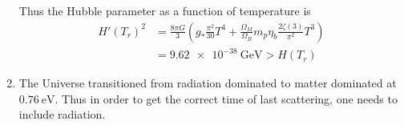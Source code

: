 \begin{enumerate}[label=\alph*)]
      Thus the Hubble parameter as a function of temperature is
      \begin{align}
         H'(T_r)^2 &=  \frac{8 \pi G}{3} \left( g_* \frac{\pi^2}{30} T^4 + \frac{\Omega_M}{\Omega_B} m_p \eta_b \frac{2\zeta(3)}{\pi^2} T^3 \right) \\
                   &= \SI{9.62e-38}{\giga \eV} > H(T_r)
      \end{align}
      \fi

   \item The Universe transitioned from radiation dominated to matter dominated at $\SI{0.76}{\eV}$. Thus in order to get the correct time of last scattering, one needs to include radiation.
\end{enumerate}
